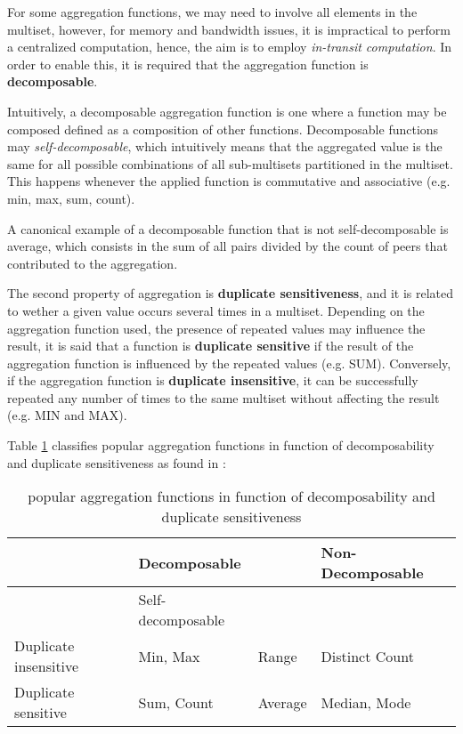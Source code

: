 For some aggregation functions, we may need to involve all elements in the multiset, however, for memory and bandwidth issues, it is impractical to perform a centralized computation, hence, the aim is to employ \textit{in-transit computation}. In order to enable this, it is required that the aggregation function is \textbf{decomposable}. 

Intuitively, a decomposable aggregation function is one where a function may be composed defined as a composition of other functions. Decomposable functions may \textit{self-decomposable}, which intuitively means that the aggregated value is the same for all possible combinations of all sub-multisets partitioned in the multiset. This happens whenever the applied function is commutative and associative (e.g. min, max, sum, count).

A canonical example of a decomposable function that is not self-decomposable is average, which consists in the sum of all pairs divided by the count of peers that contributed to the aggregation.

The second property of aggregation is \textbf{duplicate sensitiveness}, and it is related to wether a given value occurs several times in a multiset. Depending on the aggregation function used, the presence of repeated values may influence the result, it is said that a function is \textbf{duplicate sensitive} if the result of the aggregation function is influenced by the repeated values (e.g. SUM). Conversely, if the aggregation function is \textbf{duplicate insensitive}, it can be successfully repeated any number of times to the same multiset without affecting the result (e.g. MIN and MAX).

Table \ref{table:aggregation_functions} classifies popular aggregation functions in function of decomposability and duplicate sensitiveness as found in \cite{DBLP:journals/corr/abs-1110-0725}:

\begin{table}[]
    \begin{tabular}{|l|l|l|l|}
    \hline
                          & \multicolumn{2}{l|}{Decomposable} & Non-Decomposable  \\ \hline
                          & Self-decomposable    &                             &  \\ \hline
    Duplicate insensitive & Min, Max             & Range     & Distinct Count    \\ \hline
    Duplicate sensitive   & Sum, Count           & Average   & Median, Mode     \\ \hline
    \end{tabular}
    \caption{popular aggregation functions in function of decomposability and duplicate sensitiveness}
    \label{table:aggregation_functions}
\end{table}

